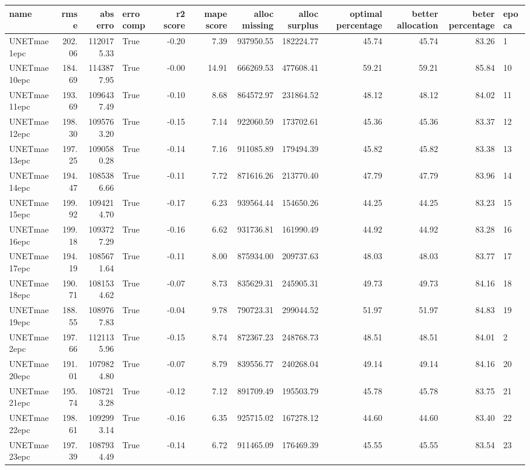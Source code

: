 \begin{tabular}{lrrlrrrrrrrl}
\toprule
name & rmse & abs erro & erro comp & r2 score & mape score & alloc missing & alloc surplus & optimal percentage & better allocation & beter percentage & epoca \\
\midrule
UNETmae1epc & 202.06 & 1120175.33 & True & -0.20 & 7.39 & 937950.55 & 182224.77 & 45.74 & 45.74 & 83.26 & 1 \\
UNETmae10epc & 184.69 & 1143877.95 & True & -0.00 & 14.91 & 666269.53 & 477608.41 & 59.21 & 59.21 & 85.84 & 10 \\
UNETmae11epc & 193.69 & 1096437.49 & True & -0.10 & 8.68 & 864572.97 & 231864.52 & 48.12 & 48.12 & 84.02 & 11 \\
UNETmae12epc & 198.30 & 1095763.20 & True & -0.15 & 7.14 & 922060.59 & 173702.61 & 45.36 & 45.36 & 83.37 & 12 \\
UNETmae13epc & 197.25 & 1090580.28 & True & -0.14 & 7.16 & 911085.89 & 179494.39 & 45.82 & 45.82 & 83.38 & 13 \\
UNETmae14epc & 194.47 & 1085386.66 & True & -0.11 & 7.72 & 871616.26 & 213770.40 & 47.79 & 47.79 & 83.96 & 14 \\
UNETmae15epc & 199.92 & 1094214.70 & True & -0.17 & 6.23 & 939564.44 & 154650.26 & 44.25 & 44.25 & 83.23 & 15 \\
UNETmae16epc & 199.18 & 1093727.29 & True & -0.16 & 6.62 & 931736.81 & 161990.49 & 44.92 & 44.92 & 83.28 & 16 \\
UNETmae17epc & 194.19 & 1085671.64 & True & -0.11 & 8.00 & 875934.00 & 209737.63 & 48.03 & 48.03 & 83.77 & 17 \\
UNETmae18epc & 190.71 & 1081534.62 & True & -0.07 & 8.73 & 835629.31 & 245905.31 & 49.73 & 49.73 & 84.16 & 18 \\
UNETmae19epc & 188.55 & 1089767.83 & True & -0.04 & 9.78 & 790723.31 & 299044.52 & 51.97 & 51.97 & 84.83 & 19 \\
UNETmae2epc & 197.66 & 1121135.96 & True & -0.15 & 8.74 & 872367.23 & 248768.73 & 48.51 & 48.51 & 84.01 & 2 \\
UNETmae20epc & 191.01 & 1079824.80 & True & -0.07 & 8.79 & 839556.77 & 240268.04 & 49.14 & 49.14 & 84.16 & 20 \\
UNETmae21epc & 195.74 & 1087213.28 & True & -0.12 & 7.12 & 891709.49 & 195503.79 & 45.78 & 45.78 & 83.75 & 21 \\
UNETmae22epc & 198.61 & 1092993.14 & True & -0.16 & 6.35 & 925715.02 & 167278.12 & 44.60 & 44.60 & 83.40 & 22 \\
UNETmae23epc & 197.39 & 1087934.49 & True & -0.14 & 6.72 & 911465.09 & 176469.39 & 45.55 & 45.55 & 83.54 & 23 \\

\end{tabular}
